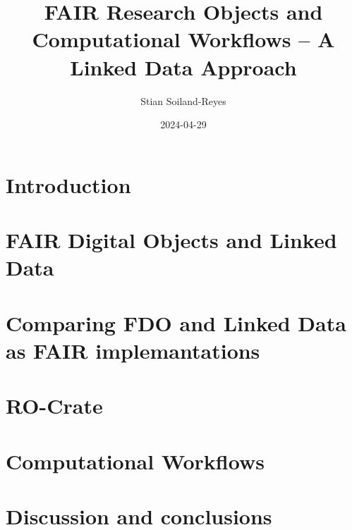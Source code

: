 \documentclass[british,a4paper]{book}
\title{FAIR Research Objects and Computational Workflows – A Linked Data Approach}
\author{Stian Soiland-Reyes}
\date{2024-04-29}
\begin{document}
\frontmatter
\maketitle



\printglossaries



\mainmatter
\fancyhead[LO]{\leftmark}

\chapter{Introduction}
\label{chapter:introduction}






\chapter{FAIR Digital Objects and Linked Data}
\label{chapter:background}


\chapter{Comparing FDO and Linked Data as FAIR implemantations}
\label{chapter:fdo}




\chapter{RO-Crate}
\label{chapter:ro-crate}





\chapter{Computational Workflows}
\label{chapter:workflows}







\chapter{Discussion and conclusions}
\label{chapter:conclusions}



\appendix
{}
\end{document}

